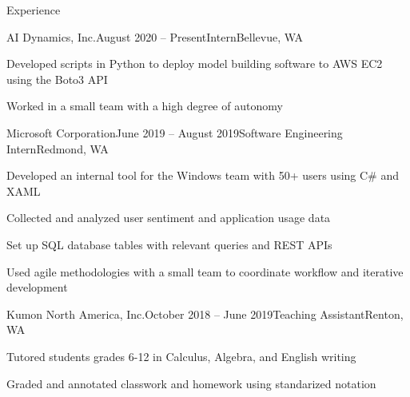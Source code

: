\documentclass{resume} %
\begin{document}

\begin{rSection}{Experience}

\begin{rSubsection}{AI Dynamics, Inc.}{August 2020 – Present}{Intern}{Bellevue, WA}
\item Developed scripts in Python to deploy model building software to AWS EC2 using the Boto3 API
\item Worked in a small team with a high degree of autonomy
\end{rSubsection}

\begin{rSubsection}{Microsoft Corporation}{June 2019 – August 2019}{Software Engineering Intern}{Redmond, WA}
\item Developed an internal tool for the Windows team with 50+ users using C\# and XAML
\item Collected and analyzed user sentiment and application usage data
\item Set up SQL database tables with relevant queries and REST APIs
\item Used agile methodologies with a small team to coordinate workflow and iterative development
\end{rSubsection}

\begin{rSubsection}{Kumon North America, Inc.}{October 2018 – June 2019}{Teaching Assistant}{Renton, WA}
\item Tutored students grades 6-12 in Calculus, Algebra, and English writing
\item Graded and annotated classwork and homework using standarized notation
\end{rSubsection}

\end{rSection}

\end{document}
